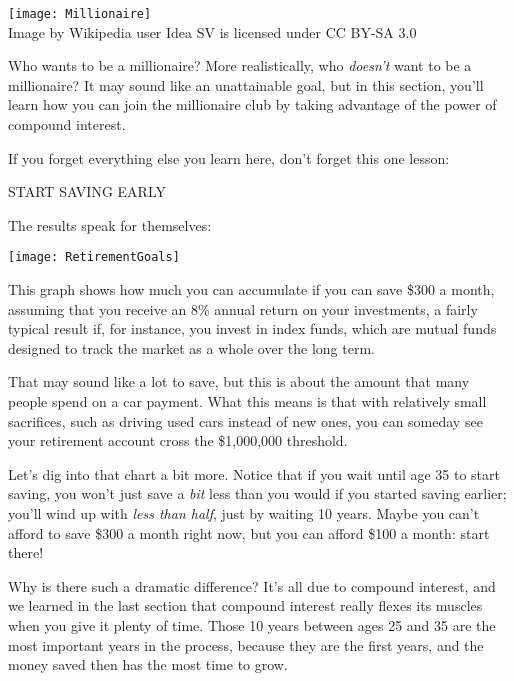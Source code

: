 \setcounter{ExampleCounter}{1}
\begin{center}
\texttt{[image: Millionaire]}\\
\text{} \hfill {\color{gray}Image by Wikipedia user Idea SV is licensed under CC BY-SA 3.0}
\end{center}

Who wants to be a millionaire?  More realistically, who \emph{doesn't} want to be a millionaire?  It may sound like an unattainable goal, but in this section, you'll learn how you can join the millionaire club by taking advantage of the power of compound interest.

If you forget everything else you learn here, don't forget this one lesson:
\begin{center}
{\LARGE START SAVING EARLY}
\end{center}

The results speak for themselves:
\begin{center}
\texttt{[image: RetirementGoals]}
\end{center}

This graph shows how much you can accumulate if you can save \$300 a month, assuming that you receive an 8\% annual return on your investments, a fairly typical result if, for instance, you invest in index funds, which are mutual funds designed to track the market as a whole over the long term.

That may sound like a lot to save, but this is about the amount that many people spend on a car payment.  What this means is that with relatively small sacrifices, such as driving used cars instead of new ones, you can someday see your retirement account cross the \$1,000,000 threshold.

Let's dig into that chart a bit more.  Notice that if you wait until age 35 to start saving, you won't just save a \emph{bit} less than you would if you started saving earlier; you'll wind up with \emph{less than half}, just by waiting 10 years.  Maybe you can't afford to save \$300 a month right now, but you can afford \$100 a month: start there!

Why is there such a dramatic difference?  It's all due to compound interest, and we learned in the last section that compound interest really flexes its muscles when you give it plenty of time.  Those 10 years between ages 25 and 35 are the most important years in the process, because they are the first years, and the money saved then has the most time to grow.

